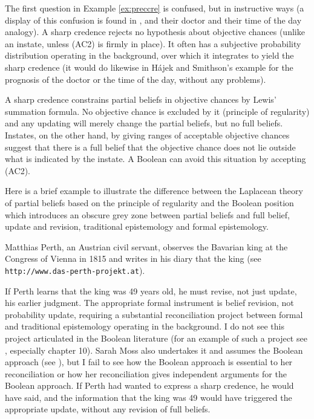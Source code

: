 \documentclass[11pt]{article}
\begin{document}
The first question in Example \ref{ex:preccre} is confused, but in
instructive ways (a display of this confusion is found in
, and their doctor and their time of
the day analogy). A sharp credence rejects no hypothesis about
objective chances (unlike an instate, unless (AC2) is firmly in
place). It often has a subjective probability distribution operating
in the background, over which it integrates to yield the sharp
credence (it would do likewise in H{\'a}jek and Smithson's example for
the prognosis of the doctor or the time of the day, without any
problems).

A sharp credence constrains partial beliefs in objective chances by
Lewis' summation formula. No objective chance is excluded by it
(principle of regularity) and any updating will merely change the
partial beliefs, but no full beliefs. Instates, on the other hand, by
giving ranges of acceptable objective chances suggest that there is a
full belief that the objective chance does not lie outside what is
indicated by the instate. A Boolean can avoid this situation by
accepting (AC2).

Here is a brief example to illustrate the difference between the
Laplacean theory of partial beliefs based on the principle of
regularity and the Boolean position which introduces an obscure grey
zone between partial beliefs and full belief, update and revision,
traditional epistemology and formal epistemology.

\begin{quotex}
  \label{ex:king} Matthias Perth, an Austrian
  civil servant, observes the Bavarian king at the Congress of Vienna
  in 1815 and writes in his diary that the king  (see
  \texttt{http://www.das-perth-projekt.at}).
\end{quotex}

If Perth learns that the king was 49 years old, he must revise, not
just update, his earlier judgment. The appropriate formal instrument
is belief revision, not probability update, requiring a substantial
reconciliation project between formal and traditional epistemology
operating in the background. I do not see this project articulated in
the Boolean literature (for an example of such a project see
, especially chapter 10). Sarah Moss also
undertakes it and assumes the Boolean approach (see
), but I fail to see how the Boolean approach is
essential to her reconciliation or how her reconciliation gives
independent arguments for the Boolean approach. If Perth had wanted to
express a sharp credence, he would have said,  and the information that the king
was 49 would have triggered the appropriate update, without any
revision of full beliefs.
\end{document}

